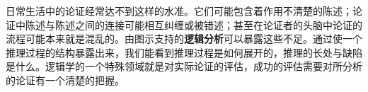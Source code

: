 日常生活中的论证经常达不到这样的水准。它们可能包含着作用不清楚的陈述；论证中陈述与陈述之间的连接可能相互纠缠或被错述；甚至在论证者的头脑中论证的流程可能本来就是混乱的。由图示支持的\textbf{逻辑分析}可以暴露这些不足。通过使一个推理过程的结构暴露出来，我们能看到推理过程是如何展开的，推理的长处与缺陷是什么。逻辑学的一个特殊领域就是对实际论证的评估，成功的评估需要对所分析的论证有一个清楚的把握。

\begin{center}
\end{center} 